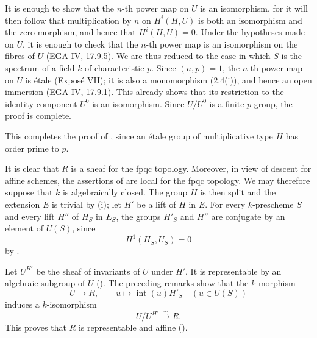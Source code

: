 

It is enough to show that the \(n\)-th power map on \(U\) is an
isomorphism, for it will then follow that multiplication by \(n\)
on \(H^i(H,U)\) is both an isomorphism and the zero morphism, and
hence that \(H^i(H,U)=0\).  Under the hypotheses made on \(U\), it
is enough to check that the \(n\)-th power map is an isomorphism
on the fibres of \(U\) (EGA IV, 17.9.5).  We are thus reduced to
the case in which \(S\) is the spectrum of a field \(k\) of
characteristic \(p\).  Since \((n,p)=1\), the \(n\)-th power map
on \(U\) is étale (Exposé VII); it is also a monomorphism (2.4(i)),
and hence an open immersion (EGA IV, 17.9.1).  This already shows
that its restriction to the identity component \(U^0\) is an
isomorphism.  Since \(U/U^0\) is a finite \(p\)-group, the proof
is complete.

This completes the proof of , since an étale group of
multiplicative type \(H\) has order prime to \(p\).

It is clear that \(R\) is a sheaf for the fpqc topology.
Moreover, in view of descent for affine schemes, the assertions
of  are local for the fpqc topology.  We may therefore
suppose that \(k\) is algebraically closed.  The group \(H\) is
then split and the extension \(E\) is trivial by (i); let
\(H'\) be a lift of \(H\) in \(E\).  For every \(k\)-prescheme
\(S\) and every lift \(H''\) of \(H_S\) in \(E_S\), the groups
\(H'_S\) and \(H''\) are conjugate by an element of \(U(S)\),
since
\[
  H^1(H_S,U_S)=0
\]
by .

Let \(U^{H'}\) be the sheaf of invariants of \(U\) under \(H'\).
It is representable by an algebraic subgroup of \(U\)
().  The preceding remarks show that the
\(k\)-morphism
\[
  U\longrightarrow R,
  \qquad
  u\longmapsto \operatorname{int}(u)H'_S
  \quad (u\in U(S))
\]
induces a \(k\)-isomorphism
\[
  U/U^{H'}\xrightarrow{\ \sim\ }R.
\]
This proves that \(R\) is representable and affine ().

